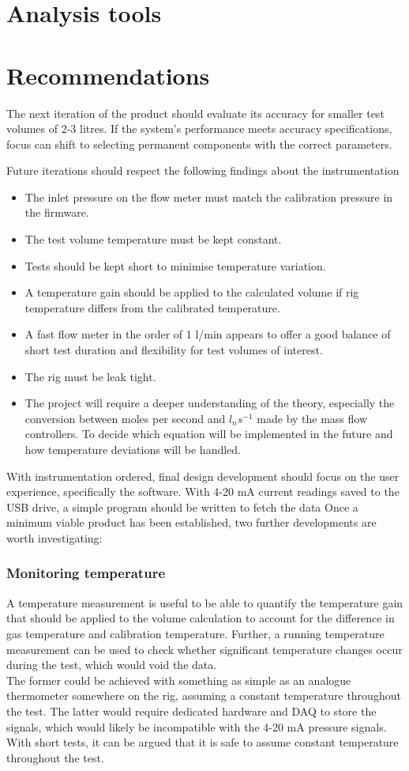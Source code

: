 \documentclass{report}
\begin{document}
\section{Analysis tools}
\section{Recommendations}
The next iteration of the product should evaluate its accuracy for smaller test volumes of 2-3 litres. If the system's performance meets accuracy specifications, focus can shift to selecting permanent components with the correct parameters.

Future iterations should respect the following findings about the instrumentation
\begin{itemize}
	\item The inlet pressure on the flow meter must match the calibration pressure  in the firmware.
	\item The test volume temperature must be kept constant.
	\item Tests should be kept short to minimise temperature variation. 
	\item A temperature gain should be applied to the calculated volume if rig temperature differs from the calibrated temperature.
	\item A fast flow meter in the order of 1 l/min appears to offer a good balance of short test duration and flexibility for test volumes of interest.
	\item The rig must be leak tight.
	\item The project will require a deeper understanding of the theory, especially the conversion between moles per second and $l_ns^{-1}$ made by the mass flow controllers. To decide which equation will be implemented in the future and how temperature deviations will be handled.
\end{itemize}	
With instrumentation ordered, final design development should focus on the user experience, specifically the software. With 4-20 mA current readings saved to the USB drive, a simple program should be written to fetch the data 
Once a minimum viable product has been established, two further developments are worth investigating:
\subsubsection{Monitoring temperature} 
A temperature measurement is useful to be able to quantify the temperature gain that should be applied to the volume calculation to account for the difference in gas temperature and calibration temperature. Further, a running temperature measurement can be used to check whether significant temperature changes occur during the test, which would void the data.\\
The former could be achieved with something as simple as an analogue thermometer somewhere on the rig, assuming a constant temperature throughout the test. The latter would require dedicated hardware and DAQ to store the signals, which would likely be incompatible with the 4-20 mA pressure signals. With short tests, it can be argued that it is safe to assume constant temperature throughout the test.
\end{document}
